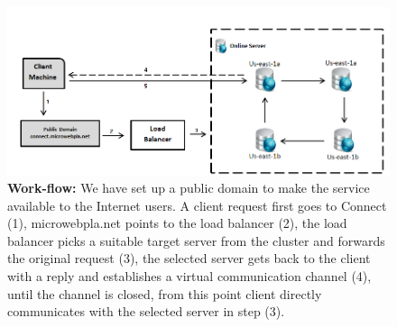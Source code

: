 \documentclass[12pt]{article}
\begin{document}
\begin{figure}[H] 
\centering
\includegraphics[scale=0.90]{Images/figure1.PNG} 
\caption{\textbf{Work-flow: }We
have set up a public domain to make the service available to the Internet users.
A client request first goes to Connect\cite{connect} (1), microwebpla.net points
to the load balancer (2), the load balancer picks a suitable target server from
the cluster and forwards the original request (3), the selected server gets back
to the client with a reply and establishes a virtual communication channel (4),
until the channel is closed, from this point client directly communicates with
the selected server in step (3).} 
\label{fig:workflow} 
\end{figure} 
\end{document}
